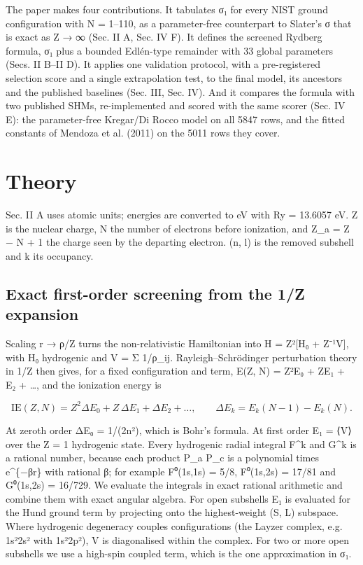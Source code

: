 \documentclass[aps,pra,preprint,superscriptaddress,amsmath,amssymb]{revtex4-2}
\begin{document}
The paper makes four contributions. It tabulates σ₁ for every NIST ground configuration with N = 1–110, as a parameter-free counterpart to Slater's σ that is exact as Z → ∞ (Sec. II A, Sec. IV F). It defines the screened Rydberg formula, σ₁ plus a bounded Edlén-type remainder with 33 global parameters (Secs. II B–II D). It applies one validation protocol, with a pre-registered selection score and a single extrapolation test, to the final model, its ancestors and the published baselines (Sec. III, Sec. IV). And it compares the formula with two published SHMs, re-implemented and scored with the same scorer (Sec. IV E): the parameter-free Kregar/Di Rocco model on all 5847 rows, and the fitted constants of Mendoza et al. (2011) on the 5011 rows they cover.


\section{Theory}

Sec. II A uses atomic units; energies are converted to eV with Ry = 13.6057 eV. Z is the nuclear charge, N the number of electrons before ionization, and Z\_a = Z − N + 1 the charge seen by the departing electron. (n, l) is the removed subshell and k its occupancy.


\subsection{Exact first-order screening from the 1/Z expansion}

Scaling r → ρ/Z turns the non-relativistic Hamiltonian into H = Z²[H₀ + Z⁻¹V], with H₀ hydrogenic and V = Σ 1/ρ\_ij. Rayleigh–Schrödinger perturbation theory in 1/Z then gives, for a fixed configuration and term, E(Z, N) = Z²E₀ + ZE₁ + E₂ + …, and the ionization energy is


\begin{equation}
\mathrm{IE}(Z,N)=Z^2\Delta E_0+Z\,\Delta E_1+\Delta E_2+\dots,\qquad \Delta E_k=E_k(N-1)-E_k(N).
\end{equation}

At zeroth order ΔE₀ = 1/(2n²), which is Bohr's formula. At first order E₁ = ⟨V⟩ over the Z = 1 hydrogenic state. Every hydrogenic radial integral F\textasciicircum{}k and G\textasciicircum{}k is a rational number, because each product P\_a P\_c is a polynomial times e\textasciicircum{}\{−βr\} with rational β; for example F⁰(1s,1s) = 5/8, F⁰(1s,2s) = 17/81 and G⁰(1s,2s) = 16/729. We evaluate the integrals in exact rational arithmetic and combine them with exact angular algebra. For open subshells E₁ is evaluated for the Hund ground term by projecting onto the highest-weight (S, L) subspace. Where hydrogenic degeneracy couples configurations (the Layzer complex, e.g. 1s²2s² with 1s²2p²), V is diagonalised within the complex. For two or more open subshells we use a high-spin coupled term, which is the one approximation in σ₁.
\end{document}
